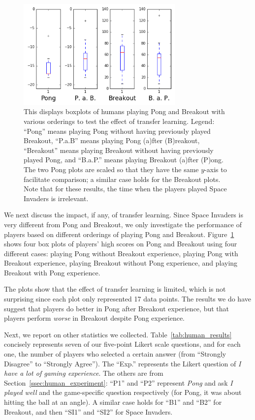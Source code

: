 \documentclass[letterpaper, 10 pt, conference]{ieeeconf}  %
\begin{document}
\begin{figure}[t]
\centering
\includegraphics[width=3.2in]{fig_boxplots_transfer_learning}
\caption{This displays boxplots of humans playing Pong and Breakout with various orderings to test
the effect of transfer learning. Legend: ``Pong'' means playing Pong without having previously
played Breakout, ``P.a.B'' means playing Pong (a)fter (B)reakout, ``Breakout'' means playing
Breakout without having previously played Pong, and ``B.a.P.'' means playing Breakout (a)fter
(P)ong. The two Pong plots are scaled so that they have the same $y$-axis to facilitate comparison;
a similar case holds for the Breakout plots. Note that for these results, the time when the players
played Space Invaders is irrelevant.}
\label{fig:human_transfer}
\end{figure}

We next discuss the impact, if any, of transfer learning. Since Space Invaders is very different
from Pong and Breakout, we only investigate the performance of players based on different orderings
of playing Pong and Breakout. Figure~\ref{fig:human_transfer} shows four box plots of players' high
scores on Pong and Breakout using four different cases: playing Pong without Breakout experience,
playing Pong with Breakout experience, playing Breakout without Pong experience, and playing
Breakout with Pong experience.

The plots show that the effect of transfer learning is limited, which is not surprising since each
plot only represented 17 data points. The results we do have suggest that players do better in Pong
after Breakout experience, but that players perform \emph{worse} in Breakout despite Pong
experience.

Next, we report on other statistics we collected. Table~\ref{tab:human_results} concisely represents
seven of our five-point Likert scale questions, and for each one, the number of players who selected
a certain answer (from ``Strongly Disagree'' to ``Strongly Agree''). The ``Exp.'' represents the
Likert question of \emph{I have a lot of gaming experience}. The others are from
Section~\ref{ssec:human_experiment}: ``P1'' and ``P2'' represent \emph{Pong} and ask \emph{I played
well} and the game-specific question respectively (for Pong, it was about hitting the ball at an
angle). A similar case holds for ``B1'' and ``B2'' for Breakout, and then ``SI1'' and ``SI2'' for
Space Invaders.
\end{document}
